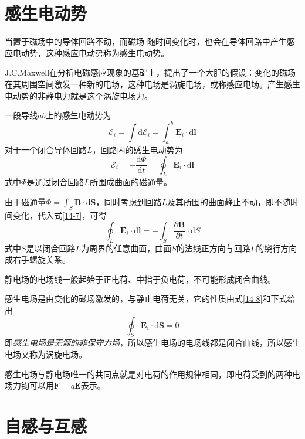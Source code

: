 \documentclass[12pt]{article}
\newcommand{\rmd}{\mathrm{d}}
\newcommand{\deriv}[2]{\frac{\rmd #1}{\rmd #2}}
\newcommand{\pderiv}[2]{\frac{\partial #1}{\partial #2}}
\begin{document}
\section{感生电动势}

当置于磁场中的导体回路不动，而磁场 随时间变化时，也会在导体回路中产生感应电动势，这种感应电动势称为感生电动势。

J.C.Maxwell在分析电磁感应现象的基础上，提出了一个大胆的假设：变化的磁场在其周围空间激发一种新的电场，这种电场是涡旋电场，或称感应电场。产生感生电动势的非静电力就是这个涡旋电场力。

一段导线\(ab\)上的感生电动势为
\begin{equation}
    \mathscr{E}_i = \int \rmd \mathscr{E}_i = \int_{a}^{b} \boldsymbol{E}_i \cdot \rmd \boldsymbol{l}
\end{equation}
对于一个闭合导体回路\(L\)，回路内的感生电动势为
\begin{equation}
    \mathscr{E}_i = -\deriv{\varPhi}{t} = \oint_L \boldsymbol{E}_i \cdot \rmd \boldsymbol{l}
    \label{14-7}
\end{equation}
式中\(\varPhi\)是通过闭合回路\(L\)所围成曲面的磁通量。

由于磁通量\(\varPhi = \int_S \boldsymbol{B} \cdot \rmd \boldsymbol{S}\)，同时考虑到回路\(L\)及其所围的曲面静止不动，即不随时间变化，代入式\ref{14-7}，可得
\begin{equation}
    \oint_L \boldsymbol{E}_i \cdot \rmd \boldsymbol{l} = -\int_{S} \pderiv{\boldsymbol{B}}{t} \cdot \rmd S
    \label{14-8}
\end{equation}
式中\(S\)是以闭合回路\(L\)为周界的任意曲面，曲面\(S\)的法线正方向与回路\(L\)的绕行方向成右手螺旋关系。

静电场的电场线一般起始于正电荷、中指于负电荷，不可能形成闭合曲线。

感生电场是由变化的磁场激发的，与静止电荷无关，它的性质由式\ref{14-8}和下式给出
\begin{equation}
    \oint_S \boldsymbol{E}_i \cdot \rmd \boldsymbol{S} = 0
\end{equation}
即\emph{感生电场是无源的非保守力场}，所以感生电场的电场线都是闭合曲线，所以感生电场又称为涡旋电场。

感生电场与静电场唯一的共同点就是对电荷的作用规律相同，即电荷受到的两种电场力钧可以用\(\boldsymbol{F} = q \boldsymbol{E}\)表示。

\section{自感与互感}
\end{document}
